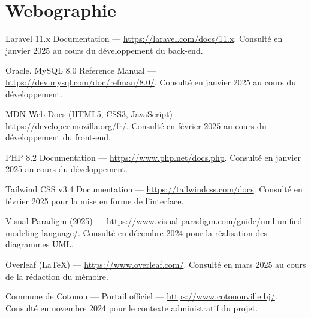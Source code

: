 \chapter*{Webographie}

\begin{enumerate}[label={[\arabic*]},
                  leftmargin=2.5em,
                  labelwidth=2em,
                  itemsep=8pt,
                  parsep=0pt,
                  start=8]

\item Laravel 11.x Documentation ---
\url{https://laravel.com/docs/11.x}.
Consulté en janvier 2025 au cours du développement du back-end.

\item Oracle. MySQL 8.0 Reference Manual ---
\url{https://dev.mysql.com/doc/refman/8.0/}.
Consulté en janvier 2025 au cours du développement.

\item MDN Web Docs (HTML5, CSS3, JavaScript) ---
\url{https://developer.mozilla.org/fr/}.
Consulté en février 2025 au cours du développement du front-end.

\item PHP 8.2 Documentation ---
\url{https://www.php.net/docs.php}.
Consulté en janvier 2025 au cours du développement.

\item Tailwind CSS v3.4 Documentation ---
\url{https://tailwindcss.com/docs}.
Consulté en février 2025 pour la mise en forme de l'interface.

\item Visual Paradigm (2025) ---
\url{https://www.visual-paradigm.com/guide/uml-unified-modeling-language/}.
Consulté en décembre 2024 pour la réalisation des diagrammes UML.

\item Overleaf (LaTeX) ---
\url{https://www.overleaf.com/}.
Consulté en mars 2025 au cours de la rédaction du mémoire.

\item Commune de Cotonou --- Portail officiel ---
\url{https://www.cotonouville.bj/}.
Consulté en novembre 2024 pour le contexte administratif du projet.

\end{enumerate}
